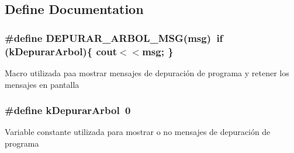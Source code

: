 \subsection{Define Documentation}
\subsubsection{\setlength{\rightskip}{0pt plus 5cm}\#define DEPURAR\_\-ARBOL\_\-MSG(msg)~if (kDepurarArbol)\{ cout$<$$<$msg; \}}\label{arbol_8h_e42f054a8a8468dd2e7d65dac410e271}


Macro utilizada paa mostrar mensajes de depuración de programa y retener los mensajes en pantalla 
\subsubsection{\setlength{\rightskip}{0pt plus 5cm}\#define kDepurarArbol~0}\label{arbol_8h_6259efd3e27119c97b2c54c50a6adc5c}


Variable constante utilizada para mostrar o no mensajes de depuración de programa 